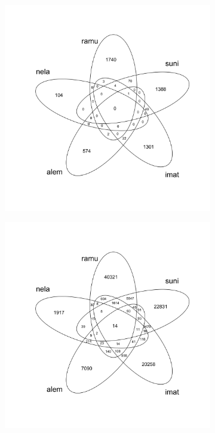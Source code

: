 \documentclass[10pt,letterpaper]{article}
\begin{document}
\begin{figure}[!h]
\centering
\begin{subfigure}{.5\textwidth}
  \centering
  \includegraphics[width=.95\linewidth]{citing_pmid.png}
  \label{fig:sub1}
\end{subfigure}%
\begin{subfigure}{.5\textwidth}
  \centering
  \includegraphics[width=.95\linewidth]{cited_sid.png}

\end{subfigure}
\end{figure}
\end{document}

